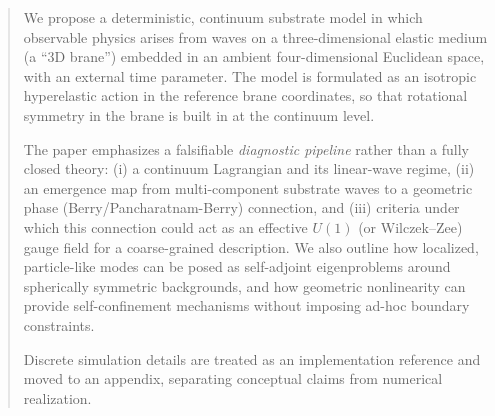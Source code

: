 \begin{abstract}
We propose a deterministic, continuum substrate model in which observable physics arises
from waves on a three-dimensional elastic medium (a ``3D brane'') embedded in an ambient
four-dimensional Euclidean space, with an external time parameter.
The model is formulated as an isotropic hyperelastic action in the reference brane coordinates,
so that rotational symmetry in the brane is built in at the continuum level.

The paper emphasizes a falsifiable \emph{diagnostic pipeline} rather than a fully closed theory:
(i) a continuum Lagrangian and its linear-wave regime, (ii) an emergence map from
multi-component substrate waves to a geometric phase (Berry/Pancharatnam-Berry)
connection, and (iii) criteria under which this connection could act as an effective
$U(1)$ (or Wilczek--Zee) gauge field for a coarse-grained description.
We also outline how localized, particle-like modes can be posed as self-adjoint eigenproblems
around spherically symmetric backgrounds, and how geometric nonlinearity can provide
self-confinement mechanisms without imposing ad-hoc boundary constraints.

Discrete simulation details are treated as an implementation reference and moved to an appendix,
separating conceptual claims from numerical realization.
\end{abstract}
